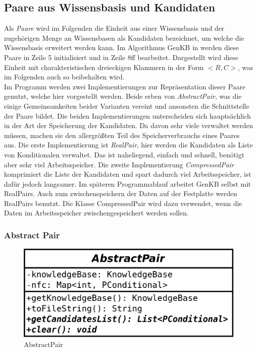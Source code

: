 \documentclass[12pt,a4paper]{article}
\begin{document}
\subsection{Paare aus Wissensbasis und Kandidaten}
Als \textit{Paare} wird im Folgenden die Einheit aus einer Wissensbasis und der zugehörigen Menge an Wissensbasen als Kandidaten bezeichnet, um welche die Wissensbasis erweitert werden kann. Im Algorithmus GenKB in \cite{beierle19} werden diese Paare in Zeile 5 initialisiert und in Zeile 8ff bearbeitet. Dargestellt wird diese Einheit mit charakteristischen dreieckigen Klammern in der Form $<R, C>$, was im Folgenden auch so beibehalten wird. \\
Im Programm werden zwei Implementierungen zur Repräsentation dieser Paare genutzt, welche hier vorgestellt werden. Beide erben von \textit{AbstractPair}, was die einige Gemeinsamkeiten beider Varianten vereint und ansonsten die Schnittstelle der Paare bildet. Die beiden Implementierungen unterscheiden sich hauptsächlich in der Art der Speicherung der Kandidaten. Da davon sehr viele verwaltet werden müssen, machen sie den allergrößten Teil des Speicherverbrauchs eines Paares aus. Die erste Implementierung ist \textit{RealPair}, hier werden die Kandidaten als Liste von Konditionalen verwaltet. Das ist naheliegend, einfach und schnell, benötigt aber sehr viel Arbeitsspeicher. Die zweite Implementierung \textit{CompressedPair} komprimiert die Liste der Kandidaten und spart dadurch viel Arbeitsspeicher, ist dafür jedoch langsamer. Im späteren Programmablauf arbeitet GenKB selbst mit RealPairs. Auch zum zwischenspeichern der Daten auf der Festplatte werden RealPairs benutzt. Die Klasse CompressedPair wird dazu verwendet, wenn die Daten im Arbeitsspeicher zwischengespeichert werden sollen.




\subsubsection{Abstract Pair}
\label{sec:abstractpair}

\begin{figure}
\includegraphics[width=0.45\linewidth]{bilder/AbstractPair.png}
\caption{AbstractPair}
\label{pic:abstractpair}
\end{figure}
\end{document}
